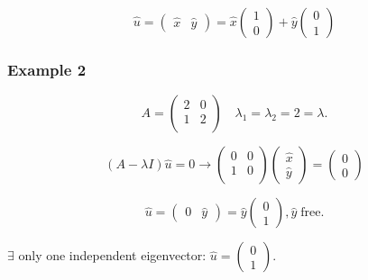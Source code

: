 \documentclass[12pt]{article}
\begin{document}
\begin{equation}
  \hat{u} =
  \begin{pmatrix}
    \hat{x} & \hat{y}
  \end{pmatrix} =
  \hat{x}
  \begin{pmatrix}
    1 \\ 0
  \end{pmatrix} +
  \hat{y}
  \begin{pmatrix}
    0 \\ 1
  \end{pmatrix}
\end{equation}

\subsubsection{Example 2}
\begin{equation}
  A =
  \begin{pmatrix}
    2 & 0 \\ 1 & 2 \\
  \end{pmatrix}
\quad \lambda_1 = \lambda_2 = 2 = \lambda.
\end{equation}

\begin{equation}
  (A-\lambda I)\hat{u}=0 \longrightarrow
  \begin{pmatrix}
    0 & 0 \\ 1 & 0 \\
  \end{pmatrix}
  \begin{pmatrix}
    \hat{x} \\ \hat{y}
  \end{pmatrix} =
  \begin{pmatrix}
    0 \\ 0
  \end{pmatrix}
\end{equation}

\begin{equation}
  \hat{u} =
  \begin{pmatrix}
    0 & \hat{y}
  \end{pmatrix} =
  \hat{y}
  \begin{pmatrix}
    0 \\ 1
  \end{pmatrix}, \hat{y}\;\text{free}.
\end{equation}

$\exists$ only one independent eigenvector: $\hat{u}=
\begin{pmatrix}
  0 \\ 1
\end{pmatrix}$.
\end{document}
